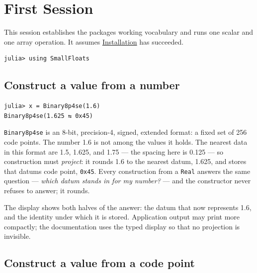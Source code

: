 \section{First Session}



\label{9478772230533179623}{}


This session establishes the package{\textquotesingle}s working vocabulary and runs one scalar and one array operation. It assumes \href{install\_\allowbreak{}and\_\allowbreak{}verify.md}{Installation} has succeeded.




\begin{verbatim}
julia> using SmallFloats
\end{verbatim}



\subsection{Construct a value from a number}



\label{13590295355553664515}{}



\begin{verbatim}
julia> x = Binary8p4se(1.6)
Binary8p4se(1.625 ⇆ 0x45)
\end{verbatim}



\texttt{Binary8p4se} is an 8-bit, precision-4, signed, extended format: a fixed set of 256 code points. The number 1.6 is not among the values it holds. The nearest data in this format are 1.5, 1.625, and 1.75 — the spacing here is 0.125 — so construction must \emph{project}: it rounds 1.6 to the nearest datum, 1.625, and stores that datum{\textquotesingle}s code point, \texttt{0x45}. Every construction from a \texttt{Real} answers the same question — \emph{which datum stands in for my number?} — and the constructor never refuses to answer; it rounds.



The display shows both halves of the answer: the datum that now represents 1.6, and the identity under which it is stored. Application output may print more compactly; the documentation uses the typed display so that no projection is invisible.



\subsection{Construct a value from a code point}



